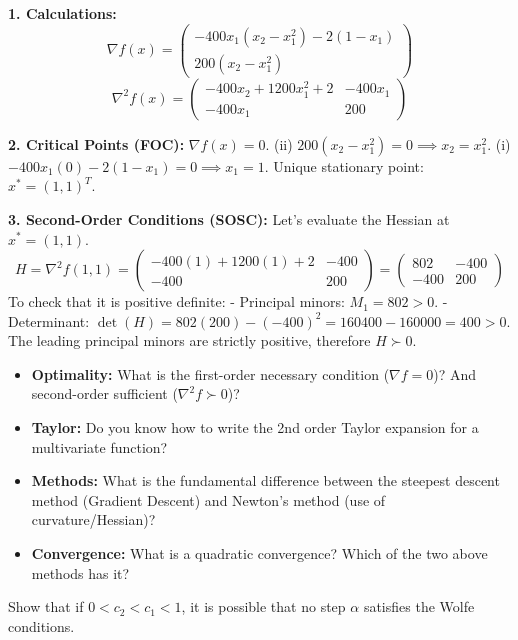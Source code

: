 \begin{correction}
\textbf{1. Calculations:}
$$ \nabla f(x) = \begin{pmatrix} -400x_1(x_2 - x_1^2) - 2(1-x_1) \\ 200(x_2 - x_1^2) \end{pmatrix} $$
$$ \nabla^2 f(x) = \begin{pmatrix} -400x_2 + 1200x_1^2 + 2 & -400x_1 \\ -400x_1 & 200 \end{pmatrix} $$

\textbf{2. Critical Points (FOC):}
$\nabla f(x) = 0$.
(ii) $200(x_2 - x_1^2) = 0 \implies x_2 = x_1^2$.
(i) $-400x_1(0) - 2(1-x_1) = 0 \implies x_1 = 1$.
Unique stationary point: $x^* = (1, 1)^T$.

\textbf{3. Second-Order Conditions (SOSC):}
Let's evaluate the Hessian at $x^*=(1,1)$.
$$ H = \nabla^2 f(1,1) = \begin{pmatrix} -400(1) + 1200(1) + 2 & -400 \\ -400 & 200 \end{pmatrix} = \begin{pmatrix} 802 & -400 \\ -400 & 200 \end{pmatrix} $$
To check that it is positive definite:
- Principal minors: $M_1 = 802 > 0$.
- Determinant: $\det(H) = 802(200) - (-400)^2 = 160400 - 160000 = 400 > 0$.
The leading principal minors are strictly positive, therefore $H \succ 0$.
\end{correction}
\bigskip
\bigskip
\begin{checkpoint}
\begin{itemize}
    \item \textbf{Optimality:} What is the first-order necessary condition ($\nabla f = 0$)? And second-order sufficient ($\nabla^2 f \succ 0$)?
    \item \textbf{Taylor:} Do you know how to write the 2nd order Taylor expansion for a multivariate function?
    \item \textbf{Methods:} What is the fundamental difference between the steepest descent method (Gradient Descent) and Newton's method (use of curvature/Hessian)?
    \item \textbf{Convergence:} What is a quadratic convergence? Which of the two above methods has it?
\end{itemize}
\end{checkpoint}

\bigskip
\begin{exercice}
Show that if $0 < c_2 < c_1 < 1$, it is possible that no step $\alpha$ satisfies the Wolfe conditions.
\end{exercice}

